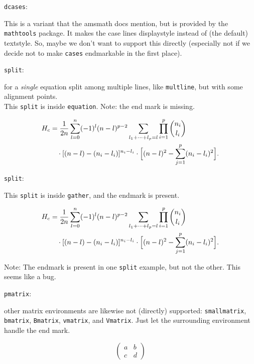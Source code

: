\documentclass[leqno]{article}
\newcommand{\testtype}[2]{\texttt{#1}:%
  #2}
\newcommand{\makeoutertest}[3]{
  \begin{test}
    \testtype{#1}{#2}
    #3
  \end{test}
}
\begin{document}
\makeoutertest{dcases}{
  This is a variant that the amsmath docs mention, but is provided by the \texttt{mathtools} package.
  It makes the case lines displaystyle instead of (the default) textstyle.
  So, maybe we don't want to support this directly (especially not if we decide not to make \texttt{cases} endmarkable in the first place).
}{
  \break [\emph{no example here}]
}



\makeoutertest{split}{
  for a \emph{single} equation split among multiple lines, like \texttt{multline}, but with some alignment points.\\
  This \texttt{split} is inside \texttt{equation}.
  Note: the end mark is missing.
}{
  \begin{equation}
    \begin{split}
      H_c
      &=\frac{1}{2n} \sum^n_{l=0}(-1)^{l}(n-{l})^{p-2}
        \sum_{l _1+\dots+ l _p=l}\prod^p_{i=1} \binom{n_i}{l _i}\\
      &\quad\cdot[(n-l )-(n_i-l _i)]^{n_i-l _i}\cdot
        \Bigl[(n-l )^2-\sum^p_{j=1}(n_i-l _i)^2\Bigr].
    \end{split}
  \end{equation}
}

\makeoutertest{split}{
  This \texttt{split} is inside \texttt{gather}, and the endmark is present.
}{
  \begin{gather}
    \begin{split}
      H_c
      &=\frac{1}{2n} \sum^n_{l=0}(-1)^{l}(n-{l})^{p-2}
        \sum_{l _1+\dots+ l _p=l}\prod^p_{i=1} \binom{n_i}{l _i}\\
      &\quad\cdot[(n-l )-(n_i-l _i)]^{n_i-l _i}\cdot
        \Bigl[(n-l )^2-\sum^p_{j=1}(n_i-l _i)^2\Bigr].
    \end{split}%
  \end{gather}
}
Note: The endmark is present in one \texttt{split} example, but not the other.
This seems like a bug.


\makeoutertest{pmatrix}{
  other matrix environments are likewise not (directly) supported: \texttt{smallmatrix}, \texttt{bmatrix}, \texttt{Bmatrix}, \texttt{vmatrix}, and \texttt{Vmatrix}.
  Just let the surrounding environment handle the end mark.
}{
  \[\begin{pmatrix}
    a&b\\ c&d
  \end{pmatrix}\]
}
\end{document}
